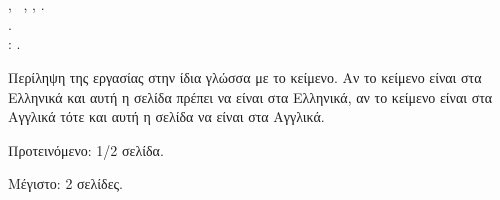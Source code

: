 \chapter*{\abstractname}
\addstarredchapter{\abstractname} %

\makeatletter
\@author, \cseabstracttype\ifPhD\else\ \cseabstractcs\fi, \cseabstractdpt, \@date.\\
\@title.\\
\cseabstractsup: \advisor.
\makeatother

\bigskip
\bigskip

\noindent Περίληψη της εργασίας στην ίδια γλώσσα με το κείμενο.
Αν το κείμενο είναι στα Ελληνικά και αυτή η σελίδα πρέπει να είναι στα Ελληνικά, αν το κείμενο είναι στα Αγγλικά τότε και αυτή η σελίδα να είναι στα Αγγλικά.

\bigskip

\noindent Προτεινόμενο: 1/2 σελίδα.

\noindent Μέγιστο: 2 σελίδες.